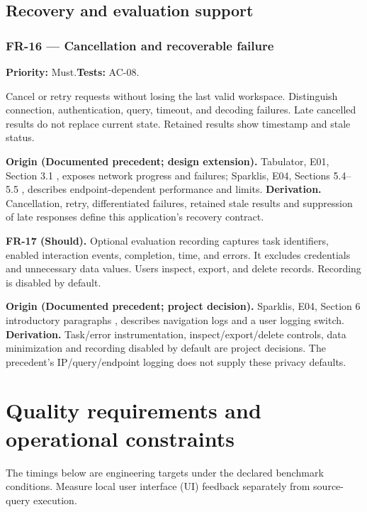 \documentclass[11pt,a4paper]{article}
\newcommand{\req}[4]{\subsubsection*{#1 --- #2}\phantomsection\label{req:#1}\textbf{Priority:} #3.\quad\textbf{Tests:} #4.\par}
\newcommand{\origin}[3]{\par{\small\textbf{Origin (#1).} #2 \textbf{Derivation.} #3\par}}
\begin{document}
\subsection{Recovery and evaluation support}
\par\noindent\begin{minipage}{\linewidth}
\req{FR-16}{Cancellation and recoverable failure}{Must}{AC-08}
Cancel or retry requests without losing the last valid workspace. Distinguish connection, authentication, query, timeout, and decoding failures. Late cancelled results do not replace current state. Retained results show timestamp and stale status.
\origin{Documented precedent; design extension}{Tabulator, E01, Section 3.1 \citep{tabulator}, exposes network progress and failures; Sparklis, E04, Sections 5.4--5.5 \citep{sparklis}, describes endpoint-dependent performance and limits.}{Cancellation, retry, differentiated failures, retained stale results and suppression of late responses define this application's recovery contract.}
\end{minipage}\par
\par\noindent\begin{minipage}{\linewidth}
\textbf{FR-17 (Should).} Optional evaluation recording captures task identifiers, enabled interaction events, completion, time, and errors. It excludes credentials and unnecessary data values. Users inspect, export, and delete records. Recording is disabled by default.
\origin{Documented precedent; project decision}{Sparklis, E04, Section 6 introductory paragraphs \citep{sparklis}, describes navigation logs and a user logging switch.}{Task/error instrumentation, inspect/export/delete controls, data minimization and recording disabled by default are project decisions. The precedent's IP/query/endpoint logging does not supply these privacy defaults.}
\end{minipage}\par

\section{Quality requirements and operational constraints}
The timings below are engineering targets under the declared benchmark conditions. Measure local user interface (UI) feedback separately from source-query execution.
\end{document}
